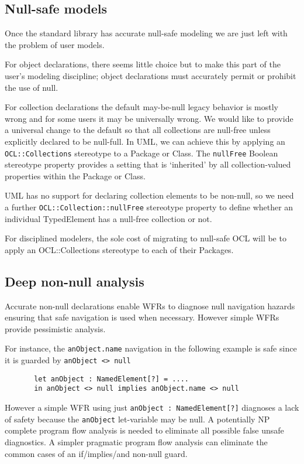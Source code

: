 \documentclass{llncs}
\begin{document}
\subsection{Null-safe models}    
      
Once the standard library has accurate null-safe modeling we are just left with the problem of user models.

For object declarations, there seems little choice but to make this part of the user's modeling discipline; object declarations must accurately permit or prohibit the use of null.

For collection declarations the default may-be-null legacy behavior is mostly wrong and for some users it may be universally wrong. We would like to provide a universal change to the default so that all collections are null-free unless explicitly declared to be null-full. In UML, we can achieve this by applying an \verb$OCL::Collections$ stereotype to a Package or Class. The \verb$nullFree$ Boolean stereotype property provides a setting that is `inherited' by all collection-valued properties within the Package or Class.

UML has no support for declaring collection elements to be non-null, so we need a further \verb$OCL::Collection::nullFree$ stereotype property to define whether an individual TypedElement has a null-free collection or not.

For disciplined modelers, the sole cost of migrating to null-safe OCL will be to apply an OCL::Collections stereotype to each of their Packages.

\subsection{Deep non-null analysis}

Accurate non-null declarations enable WFRs to diagnose null navigation hazards ensuring that safe navigation is used when necessary. However simple WFRs provide pessimistic analysis.

For instance, the \verb$anObject.name$ navigation in the following example is safe since it is guarded by \verb$anObject <> null$

\begin{verbatim}
       let anObject : NamedElement[?] = .... 
       in anObject <> null implies anObject.name <> null
\end{verbatim}

However a simple WFR using just \verb$anObject : NamedElement[?]$ diagnoses a lack of safety because the \verb$anObject$ let-variable may be null. A potentially NP complete program flow analysis is needed to eliminate all possible false unsafe diagnostics. A simpler pragmatic program flow analysis can eliminate the common cases of an if/implies/and non-null guard.
\end{document}
